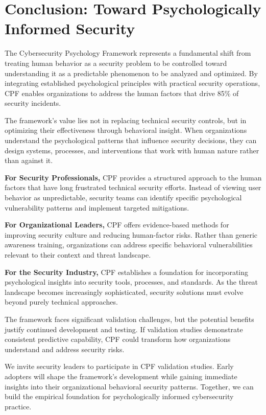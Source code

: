 \documentclass[11pt,a4paper]{article}
\begin{document}
\section{Conclusion: Toward Psychologically Informed Security}

The Cybersecurity Psychology Framework represents a fundamental shift from treating human behavior as a security problem to be controlled toward understanding it as a predictable phenomenon to be analyzed and optimized. By integrating established psychological principles with practical security operations, CPF enables organizations to address the human factors that drive 85\% of security incidents.

The framework's value lies not in replacing technical security controls, but in optimizing their effectiveness through behavioral insight. When organizations understand the psychological patterns that influence security decisions, they can design systems, processes, and interventions that work with human nature rather than against it.

\textbf{For Security Professionals,} CPF provides a structured approach to the human factors that have long frustrated technical security efforts. Instead of viewing user behavior as unpredictable, security teams can identify specific psychological vulnerability patterns and implement targeted mitigations.

\textbf{For Organizational Leaders,} CPF offers evidence-based methods for improving security culture and reducing human-factor risks. Rather than generic awareness training, organizations can address specific behavioral vulnerabilities relevant to their context and threat landscape.

\textbf{For the Security Industry,} CPF establishes a foundation for incorporating psychological insights into security tools, processes, and standards. As the threat landscape becomes increasingly sophisticated, security solutions must evolve beyond purely technical approaches.

The framework faces significant validation challenges, but the potential benefits justify continued development and testing. If validation studies demonstrate consistent predictive capability, CPF could transform how organizations understand and address security risks.

We invite security leaders to participate in CPF validation studies. Early adopters will shape the framework's development while gaining immediate insights into their organizational behavioral security patterns. Together, we can build the empirical foundation for psychologically informed cybersecurity practice.
\end{document}
